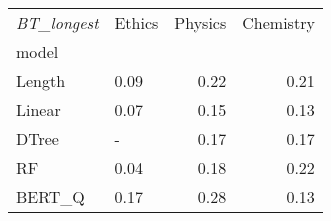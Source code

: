 \begin{tabular}{llrr}
\toprule
\textit{BT\_longest} & Ethics &  Physics &  Chemistry \\
model  &        &          &            \\
\midrule
Length &   0.09 &     0.22 &       0.21 \\
Linear &   0.07 &     0.15 &       0.13 \\
DTree  &      - &     0.17 &       0.17 \\
RF     &   0.04 &     0.18 &       0.22 \\
BERT\_Q &   0.17 &     0.28 &       0.13 \\
\bottomrule
\end{tabular}
